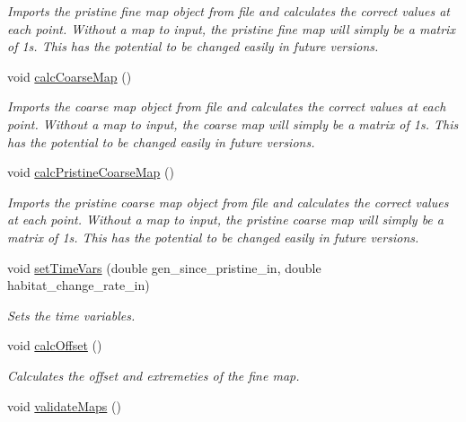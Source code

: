 \begin{DoxyCompactItemize}
\begin{DoxyCompactList}\small\item\em Imports the pristine fine map object from file and calculates the correct values at each point. Without a map to input, the pristine fine map will simply be a matrix of 1s. This has the potential to be changed easily in future versions. \end{DoxyCompactList}\item 
void \hyperlink{class_map_ac0b46ec7e4792d6ad3d7bdcf358ecabf}{calc\+Coarse\+Map} ()\hypertarget{class_map_ac0b46ec7e4792d6ad3d7bdcf358ecabf}{}\label{class_map_ac0b46ec7e4792d6ad3d7bdcf358ecabf}

\begin{DoxyCompactList}\small\item\em Imports the coarse map object from file and calculates the correct values at each point. Without a map to input, the coarse map will simply be a matrix of 1s. This has the potential to be changed easily in future versions. \end{DoxyCompactList}\item 
void \hyperlink{class_map_a4efc51f5d4e2bb562cf4126a7f291f33}{calc\+Pristine\+Coarse\+Map} ()\hypertarget{class_map_a4efc51f5d4e2bb562cf4126a7f291f33}{}\label{class_map_a4efc51f5d4e2bb562cf4126a7f291f33}

\begin{DoxyCompactList}\small\item\em Imports the pristine coarse map object from file and calculates the correct values at each point. Without a map to input, the pristine coarse map will simply be a matrix of 1s. This has the potential to be changed easily in future versions. \end{DoxyCompactList}\item 
void \hyperlink{class_map_a1b3b545f5435170d29820b061a924378}{set\+Time\+Vars} (double gen\+\_\+since\+\_\+pristine\+\_\+in, double habitat\+\_\+change\+\_\+rate\+\_\+in)
\begin{DoxyCompactList}\small\item\em Sets the time variables. \end{DoxyCompactList}\item 
void \hyperlink{class_map_a7615f4c20da51b3a96d60f9fa89ec73e}{calc\+Offset} ()
\begin{DoxyCompactList}\small\item\em Calculates the offset and extremeties of the fine map. \end{DoxyCompactList}\item 
void \hyperlink{class_map_a123d710095a549030f2c801ccf9645f1}{validate\+Maps} ()\hypertarget{class_map_a123d710095a549030f2c801ccf9645f1}{}\label{class_map_a123d710095a549030f2c801ccf9645f1}


\end{DoxyCompactItemize}
